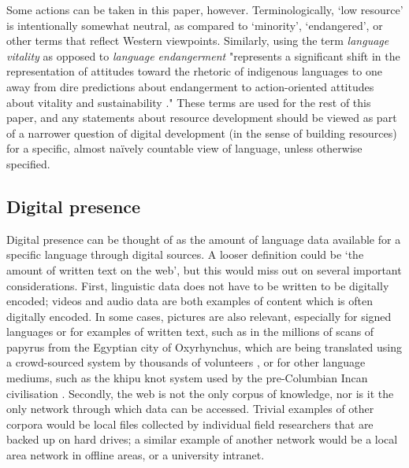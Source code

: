 
Some actions can be taken in this paper, however. Terminologically, `low resource' is intentionally somewhat neutral, as compared to `minority', `endangered', or other terms that reflect Western viewpoints. Similarly, using the term {\it language vitality} as opposed to {\it language endangerment} "represents a significant shift in the representation of attitudes toward the rhetoric of indigenous languages to one away from dire predictions about endangerment to action-oriented attitudes about vitality and sustainability \citep{grenoble2016response}." These terms are used for the rest of this paper, and any statements about resource development should be viewed as part of a narrower question of digital development (in the sense of building resources) for a specific, almost na\"ively countable view of language, unless otherwise specified.

\subsection{Digital presence}

Digital presence can be thought of as the amount of language data available for a specific language through digital sources. A looser definition could be `the amount of written text on the web', but this would miss out on several important considerations. First, linguistic data does not have to be written to be digitally encoded; videos and audio data are both examples of content which is often digitally encoded. In some cases, pictures are also relevant, especially for signed languages or for examples of written text, such as in the millions of scans of papyrus from the Egyptian city of Oxyrhynchus, which are being translated using a crowd-sourced system by thousands of volunteers \citep{williams2014computational}, or for other language mediums, such as the khipu knot system used by the pre-Columbian Incan civilisation \citep{quilter2002narrative}. Secondly, the web is not the only corpus of knowledge, nor is it the only network through which data can be accessed. Trivial examples of other corpora would be local files collected by individual field researchers that are backed up on hard drives; a similar example of another network would be a local area network in offline areas, or a university intranet.

